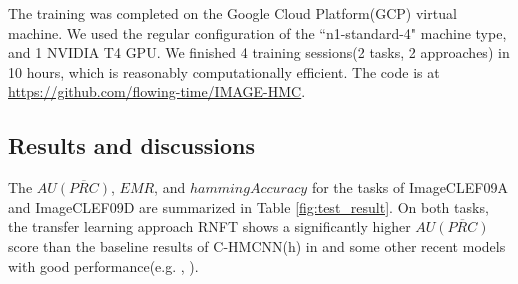 \documentclass[wcp]{jmlr}
\begin{document}
The training was completed on the Google Cloud Platform(GCP) virtual machine. We used the regular configuration of the ``n1-standard-4" machine type, and 1 NVIDIA T4 GPU.  We finished 4 training sessions(2 tasks, 2 approaches) in 10 hours, which is reasonably computationally efficient. The code is at \url{https://github.com/flowing-time/IMAGE-HMC}.


\subsection{Results and discussions}
The $AU\overline{(PRC)}$, $EMR$, and $hammingAccuracy$ for the tasks of ImageCLEF09A and ImageCLEF09D are summarized in Table \ref{fig:test_result}.
On both tasks, the transfer learning approach RNFT shows a significantly higher $AU\overline{(PRC)}$ score than the baseline results of C-HMCNN(h) in  \cite{Giunchiglia01} and some other recent models with good performance(e.g. \cite{Wehrmann01}, \cite{pelka18}). %
\end{document}
